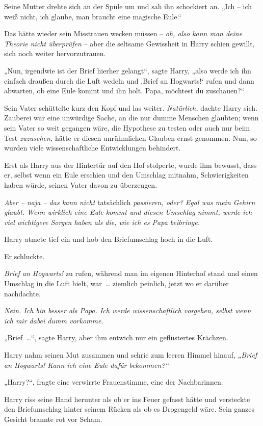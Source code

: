 Seine Mutter drehte sich an der Spüle um und sah ihn schockiert an. „Ich – ich weiß nicht, ich glaube, man braucht eine magische Eule.“

Das hätte wieder sein Misstrauen wecken müssen – \emph{oh, also kann man deine Theorie nicht überprüfen} – aber die seltsame Gewissheit in Harry schien gewillt, sich noch weiter hervorzutrauen.

„Nun, irgendwie ist der Brief hierher gelangt“, sagte Harry, „also werde ich ihn einfach draußen durch die Luft wedeln und ‚Brief an Hogwarts!‘ rufen und dann abwarten, ob eine Eule kommt und ihn holt. Papa, möchtest du zuschauen?“

Sein Vater schüttelte kurz den Kopf und las weiter. \emph{Natürlich,} dachte Harry sich. Zauberei war eine unwürdige Sache, an die nur dumme Menschen glaubten; wenn sein Vater so weit gegangen wäre, die Hypothese zu testen oder auch nur beim Test \emph{zuzusehen,} hätte er diesen unrühmlichen Glauben ernst genommen. Nun, so wurden viele wissenschaftliche Entwicklungen behindert.

Erst als Harry aus der Hintertür auf den Hof stolperte, wurde ihm bewusst, dass er, selbst wenn ein Eule erschien und den Umschlag mitnahm, Schwierigkeiten haben würde, seinen Vater davon zu überzeugen.

\emph{Aber – naja – das kann nicht} tatsächlich \emph{passieren, oder? Egal was mein Gehirn glaubt. Wenn wirklich eine Eule kommt und diesen Umschlag nimmt, werde ich viel wichtigere Sorgen haben als die, wie ich es Papa beibringe.}

Harry atmete tief ein und hob den Briefumschlag hoch in die Luft.

Er schluckte.

\emph{Brief an Hogwarts!} zu rufen, während man im eigenen Hinterhof stand und einen Umschlag in die Luft hielt, war … ziemlich peinlich, jetzt wo er darüber nachdachte.

\emph{Nein. Ich bin besser als Papa. Ich werde wissenschaftlich vorgehen, selbst wenn ich mir dabei dumm vorkomme.}

„Brief …“, sagte Harry, aber ihm entwich nur ein geflüstertes Krächzen.

Harry nahm seinen Mut zusammen und schrie zum leeren Himmel hinauf, \emph{„Brief an Hogwarts! Kann ich eine Eule dafür bekommen?“}

„Harry?“, fragte eine verwirrte Frauenstimme, eine der Nachbarinnen.

Harry riss seine Hand herunter als ob er ins Feuer gefasst hätte und versteckte den Briefumschlag hinter seinem Rücken als ob es Drogengeld wäre. Sein ganzes Gesicht brannte rot vor Scham.

